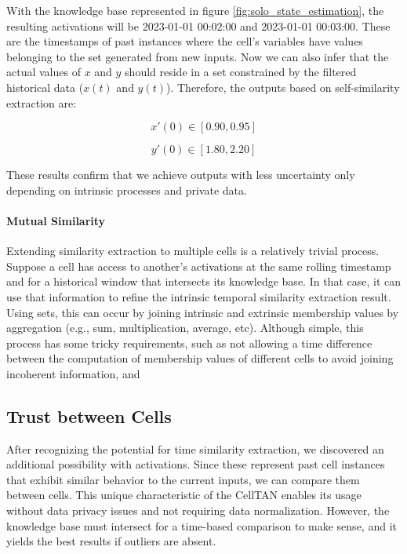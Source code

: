 With the knowledge base represented in figure \ref{fig:solo_state_estimation}, the resulting activations will be 2023-01-01 00:02:00 and 2023-01-01 00:03:00. These are the timestamps of past instances where the cell's variables have values belonging to the set generated from new inputs. Now we can also infer that the actual values of $x$ and $y$ should reside in a set constrained by the filtered historical data ($x(t)$ and $y(t)$). Therefore, the outputs based on self-similarity extraction are:

\begin{equation}
    x'(0) \in [0.90, 0.95]
\end{equation}

\begin{equation}
    y'(0) \in [1.80, 2.20]
\end{equation}

These results confirm that we achieve outputs with less uncertainty only depending on intrinsic processes and private data.

\paragraph{Mutual Similarity}

Extending similarity extraction to multiple cells is a relatively trivial process. Suppose a cell has access to another's activations at the same rolling timestamp and for a historical window that intersects its knowledge base. In that case, it can use that information to refine the intrinsic temporal similarity extraction result. Using sets, this can occur by joining intrinsic and extrinsic membership values by aggregation (e.g., sum, multiplication, average, etc).
Although simple, this process has some tricky requirements, such as not allowing a time difference between the computation of membership values of different cells to avoid joining incoherent information, and 


\subsection{Trust between Cells}  \label{subsec:trust}


After recognizing the potential for time similarity extraction, we discovered an additional possibility with activations. Since these represent past cell instances that exhibit similar behavior to the current inputs, we can compare them between cells. This unique characteristic of the CellTAN enables its usage without data privacy issues and not requiring data normalization. However, the knowledge base must intersect for a time-based comparison to make sense, and it yields the best results if outliers are absent.

